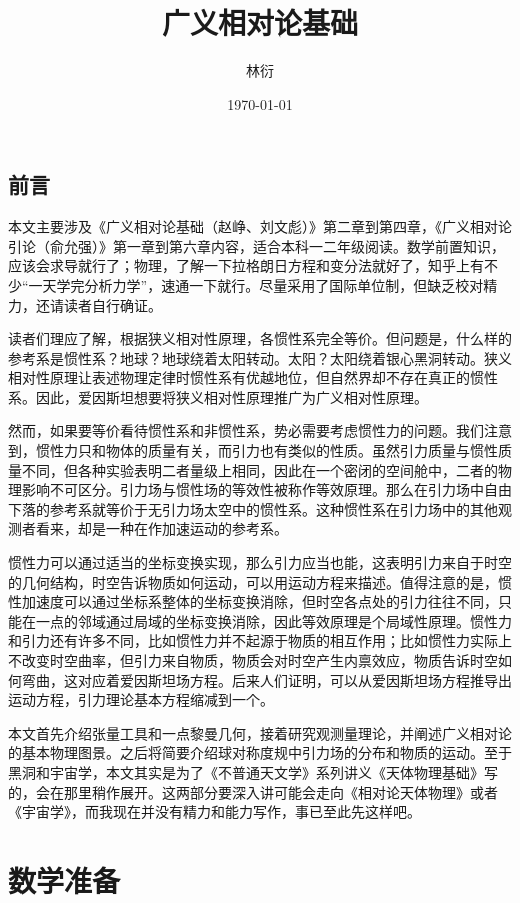 \documentclass[11pt, a4paper, oneside, onecolumn]{ctexart}
\title{广义相对论基础}
\author{林衍}
\date{\today}
\numberwithin{equation}{subsection}
\begin{document}
\maketitle
\subsection*{前言}
本文主要涉及《广义相对论基础（赵峥、刘文彪）》第二章到第四章，《广义相对论引论（俞允强）》第一章到第六章内容，适合本科一二年级阅读。数学前置知识，应该会求导就行了；物理，了解一下拉格朗日方程和变分法就好了，知乎上有不少“一天学完分析力学”，速通一下就行。尽量采用了国际单位制，但缺乏校对精力，还请读者自行确证。

读者们理应了解，根据狭义相对性原理，各惯性系完全等价。但问题是，什么样的参考系是惯性系？地球？地球绕着太阳转动。太阳？太阳绕着银心黑洞转动。狭义相对性原理让表述物理定律时惯性系有优越地位，但自然界却不存在真正的惯性系。因此，爱因斯坦想要将狭义相对性原理推广为广义相对性原理。

然而，如果要等价看待惯性系和非惯性系，势必需要考虑惯性力的问题。我们注意到，惯性力只和物体的质量有关，而引力也有类似的性质。虽然引力质量与惯性质量不同，但各种实验表明二者量级上相同，因此在一个密闭的空间舱中，二者的物理影响不可区分。引力场与惯性场的等效性被称作等效原理。那么在引力场中自由下落的参考系就等价于无引力场太空中的惯性系。这种惯性系在引力场中的其他观测者看来，却是一种在作加速运动的参考系。

惯性力可以通过适当的坐标变换实现，那么引力应当也能，这表明引力来自于时空的几何结构，时空告诉物质如何运动，可以用运动方程来描述。值得注意的是，惯性加速度可以通过坐标系整体的坐标变换消除，但时空各点处的引力往往不同，只能在一点的邻域通过局域的坐标变换消除，因此等效原理是个局域性原理。惯性力和引力还有许多不同，比如惯性力并不起源于物质的相互作用；比如惯性力实际上不改变时空曲率，但引力来自物质，物质会对时空产生内禀效应，物质告诉时空如何弯曲，这对应着爱因斯坦场方程。后来人们证明，可以从爱因斯坦场方程推导出运动方程，引力理论基本方程缩减到一个。

本文首先介绍张量工具和一点黎曼几何，接着研究观测量理论，并阐述广义相对论的基本物理图景。之后将简要介绍球对称度规中引力场的分布和物质的运动。至于黑洞和宇宙学，本文其实是为了《不普通天文学》系列讲义《天体物理基础》写的，会在那里稍作展开。这两部分要深入讲可能会走向《相对论天体物理》或者《宇宙学》，而我现在并没有精力和能力写作，事已至此先这样吧。

\newpage
\tableofcontents

\newpage
\section{数学准备}
\end{document}
